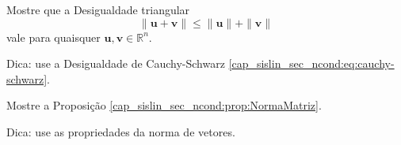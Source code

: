 \begin{exer}\label{cap_sislin_sec_ncond:exer:destria}
  Mostre que a Desigualdade triangular
  \begin{equation}
    \|\pmb{u} + \pmb{v}\| \leq \|\pmb{u}\| + \|\pmb{v}\|
  \end{equation}
  vale para quaisquer $\pmb{u},\pmb{v}\in\mathbb{R}^n$.
\end{exer}
\begin{resp}
  Dica: use a Desigualdade de Cauchy-Schwarz \eqref{cap_sislin_sec_ncond:eq:cauchy-schwarz}.
\end{resp}

\begin{exer}\label{cap_sislin_sec_ncond:exer:propNormaMatriz}
  Mostre a Proposição \ref{cap_sislin_sec_ncond:prop:NormaMatriz}.
\end{exer}
\begin{resp}
  Dica: use as propriedades da norma de vetores.
\end{resp}




